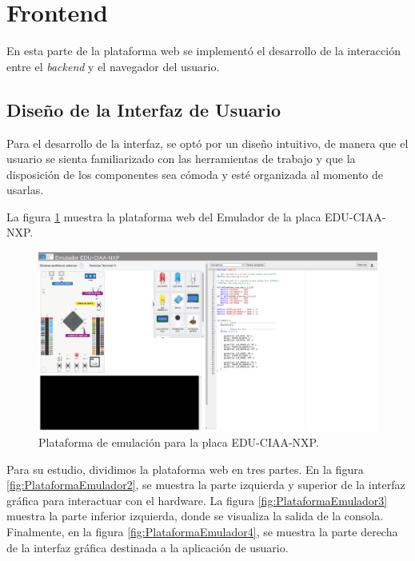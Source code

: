 \section{Frontend}
En esta parte de la plataforma web se implementó el desarrollo de la interacción entre el \textit{backend} y el navegador del usuario.


\subsection{Diseño de la Interfaz de Usuario}

Para el desarrollo de la interfaz, se optó por un diseño intuitivo, de manera que el usuario se sienta familiarizado con las herramientas de trabajo y que la disposición de los componentes sea cómoda y esté organizada al momento de usarlas.

La figura \ref{fig:PlataformaEmulador1} muestra la plataforma web del Emulador de la placa EDU-CIAA-NXP.

\begin{figure}[ht]
	\centering
	\includegraphics[scale=.20]{./Figures/PlataformaEmulador.png}
	\caption{Plataforma de emulación para la placa EDU-CIAA-NXP.}
	\label{fig:PlataformaEmulador1}
\end{figure}


Para su estudio, dividimos la plataforma web en tres partes. En la figura \ref{fig:PlataformaEmulador2}, se muestra la parte izquierda y superior de la interfaz gráfica para interactuar con el hardware. La figura \ref{fig:PlataformaEmulador3} muestra la parte inferior izquierda, donde se visualiza la salida de la consola. Finalmente, en la figura \ref{fig:PlataformaEmulador4}, se muestra la parte derecha de la interfaz gráfica destinada a la aplicación de usuario.

